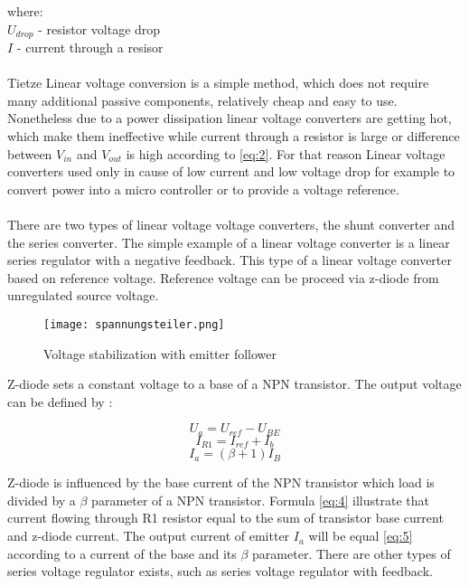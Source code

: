 where:\\
$U_{drop}$ - resistor voltage drop\\
$I$ - current through a resisor\\ \\
 Tietze \cite{18} Linear voltage conversion is a simple method, which does not require many additional passive components, relatively cheap and easy to use. Nonetheless due to a power dissipation linear voltage converters are getting hot, which make them ineffective while current through a resistor is large or difference between $V_{in}$ and $V_{out}$ is high according to \eqref{eq:2}. For that reason Linear voltage converters used only in cause of low current and low voltage drop for example to convert power into a micro controller or to provide a voltage reference.\\
 \\
 There are two types of linear voltage voltage converters, the shunt converter and the series converter. The simple example of a linear voltage converter is a linear series regulator with a negative feedback. This type of a linear voltage converter based on reference voltage. Reference voltage can be proceed via z-diode from unregulated source voltage.    
 
 
 \begin{figure}[h]
 	\centering
 	\texttt{[image: spannungsteiler.png]}
 	\caption{Voltage stabilization with emitter follower}
 	\label{fig: EPS1}
 \end{figure}
 
 Z-diode sets a constant voltage to a base of a NPN transistor. The output voltage can be defined by :
 
 \begin{equation}\label{eq:3}
 U_{a} = U_{ref} - U_{BE} 
 \end{equation}
 \begin{equation}\label{eq:4}
 I_{R1} = I_{ref}  + I_{b} 
 \end{equation}
 \begin{equation}\label{eq:5}
 I_{a} = (\beta +1)I_{B} 
 \end{equation}
 
 Z-diode is influenced by the base current of the NPN transistor which load is divided by a $\beta$ parameter of a NPN transistor. Formula \eqref{eq:4} illustrate that current flowing through R1 resistor equal to the sum of transistor base current and z-diode current. The output current of emitter  $I_{a}$ will be equal \eqref{eq:5} according to a current of the base and its $\beta$ parameter. There are other types of series voltage regulator exists, such as series voltage regulator with feedback.
 
